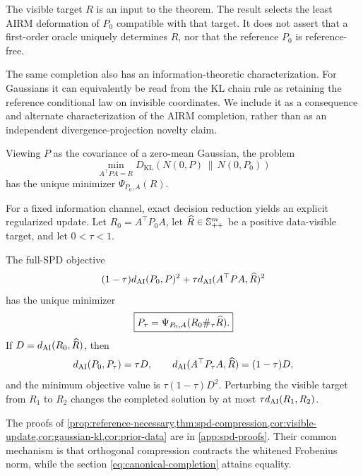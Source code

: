 \begin{remark}
The visible target \(R\) is an input to the theorem.  The result selects the
least AIRM deformation of \(P_0\) compatible with that target.  It does not
assert that a first-order oracle uniquely determines \(R\), nor that the
reference \(P_0\) is reference-free.
\end{remark}

The same completion also has an information-theoretic characterization.
For Gaussians it can equivalently be read from the KL chain rule as retaining
the reference conditional law on invisible coordinates.  We include it as a
consequence and alternate characterization of the AIRM completion, rather
than as an independent divergence-projection novelty claim.

\begin{corollary}
\label{cor:gaussian-kl}
Viewing \(P\) as the covariance of a zero-mean Gaussian, the problem
\begin{equation}
  \min_{A^\top PA=R}
  D_{\mathrm{KL}}\!\left(N(0,P)\,\|\,N(0,P_0)\right)
  \label{eq:gaussian-kl-problem}
\end{equation}
has the unique minimizer \(\Psi_{P_0,A}(R)\).
\end{corollary}

For a fixed information channel, exact decision reduction yields an explicit
regularized update.  Let \(R_0=A^\top P_0A\), let \(\widehat R\in\mathbb S_{++}^m\) be a
positive data-visible target, and let \(0<\tau<1\).

\begin{corollary}
\label{cor:prior-data}
The full-SPD objective
\begin{equation}
  (1-\tau)d_{\mathrm{AI}}(P_0,P)^2
  +\tau d_{\mathrm{AI}}(A^\top PA,\widehat R)^2
  \label{eq:prior-data-objective}
\end{equation}
has the unique minimizer
\begin{equation}
  \boxed{
  P_\tau=\Psi_{P_0,A}(R_0\#_\tau\widehat R).}
  \label{eq:prior-data-solution}
\end{equation}
If \(D=d_{\mathrm{AI}}(R_0,\widehat R)\), then
\[
  d_{\mathrm{AI}}(P_0,P_\tau)=\tau D,
  \qquad
  d_{\mathrm{AI}}(A^\top P_\tau A,\widehat R)=(1-\tau)D,
\]
and the minimum objective value is \(\tau(1-\tau)D^2\).  Perturbing the
visible target from \(R_1\) to \(R_2\) changes the completed solution by at
most \(\tau d_{\mathrm{AI}}(R_1,R_2)\).
\end{corollary}

The proofs of
\cref{prop:reference-necessary,thm:spd-compression,cor:visible-update,cor:gaussian-kl,cor:prior-data}
are in
\cref{app:spd-proofs}.  Their common mechanism is that orthogonal compression
contracts the whitened Frobenius norm, while the section
\eqref{eq:canonical-completion} attains equality.
